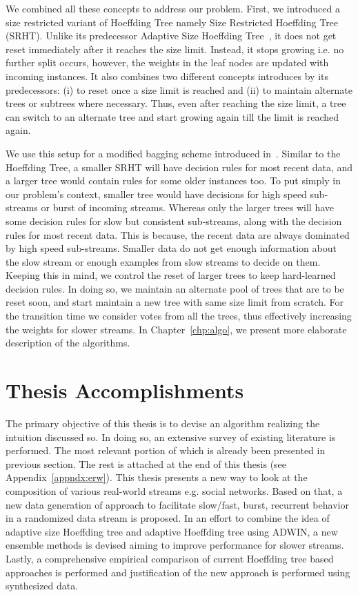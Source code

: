We combined all these concepts to address our problem. First, we introduced a size restricted variant of Hoeffding Tree namely Size Restricted Hoeffding Tree (SRHT). Unlike its predecessor Adaptive Size Hoeffding Tree~\cite{bifet09:asht}, it does not get reset immediately after it reaches the size limit. Instead, it stops growing i.e. no further split occurs, however, the weights in the leaf nodes are updated with incoming instances. It also combines two different concepts introduces by its predecessors: (i) to reset once a size limit is reached and (ii) to maintain alternate trees or subtrees where necessary. Thus, even after reaching the size limit, a tree can switch to an alternate tree and start growing again till the limit is reached again. 

We use this setup for a modified bagging scheme introduced in~\cite{bifet09:asht}. Similar to the Hoeffding Tree, a smaller SRHT will have decision rules for most recent data, and a larger tree would contain rules for some older instances too. To put simply in our problem's context, smaller tree would have decisions for high speed sub-streams or burst of incoming streams. Whereas only the larger trees will have some decision rules for slow but consistent sub-streams, along with the decision rules for most recent data. This is because, the recent data are always dominated by high speed sub-streams. Smaller data do not get enough information about the slow stream or enough examples from slow streams to decide on them. Keeping this in mind, we control the reset of larger trees to keep hard-learned decision rules. In doing so, we maintain an alternate pool of trees that are to be reset soon, and start maintain a new tree with same size limit from scratch. For the transition time we consider votes from all the trees, thus effectively increasing the weights for slower streams. In Chapter~\ref{chp:algo}, we present more elaborate description of the algorithms.



\section{Thesis Accomplishments}
The primary objective of this thesis is to devise an algorithm realizing the intuition discussed so. In doing so, an extensive survey of existing literature is performed. The most relevant portion of which is already been presented in previous section. The rest is attached at the end of this thesis (see Appendix~\ref{appndx:erw}). This thesis presents a new way to look at the composition of various real-world streams e.g. social networks. Based on that, a new data generation of approach to facilitate slow/fast, burst, recurrent behavior in a randomized data stream is proposed. In an effort to combine the idea of adaptive size Hoeffding tree and adaptive Hoeffding tree using ADWIN, a new ensemble methods is devised aiming to improve performance for slower streams. Lastly, a comprehensive empirical comparison of current Hoeffding tree based approaches is performed and justification of the new approach is performed using synthesized data.


